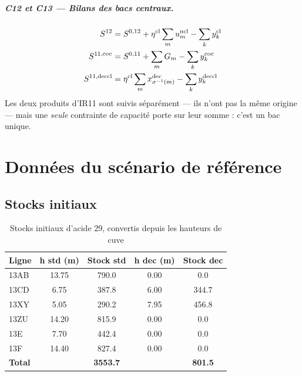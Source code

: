 \paragraph{C12 et C13 --- Bilans des bacs centraux.}
\begin{align}
S^{12} &= S^{0,12} + \eta^{\mathrm{cl}} \sum_{m} u^{\mathrm{ncl}}_m - \sum_{k} y^{\mathrm{cl}}_{k} \\
S^{11,\mathrm{coc}} &= S^{0,11} + \sum_{m} G_m - \sum_{k} y^{\mathrm{coc}}_{k} \\
S^{11,\mathrm{deccl}} &= \eta^{\mathrm{cl}} \sum_{m} x^{\mathrm{dec}}_{\sigma^{-1}(m)} - \sum_{k} y^{\mathrm{deccl}}_{k}
\end{align}
Les deux produits d'IR11 sont suivis séparément --- ils n'ont pas la même origine --- mais
une \emph{seule} contrainte de capacité porte sur leur somme : c'est un bac unique.

\chapter{Données du scénario de référence}
\label{ann:donnees}

\section{Stocks initiaux}

\begin{table}[H]
\centering
\caption{Stocks initiaux d'acide 29, convertis depuis les hauteurs de cuve}
\label{tab:stocks-29}
\begin{tabular}{@{}lS[table-format=2.2]S[table-format=4.1]S[table-format=1.2]S[table-format=3.1]@{}}
\toprule
\textbf{Ligne} & {\textbf{h std} (\si{\meter})} & {\textbf{Stock std}} & {\textbf{h dec} (\si{\meter})} & {\textbf{Stock dec}} \\
\midrule
13AB & 13.75 & 790.0 & 0.00 & 0.0 \\
13CD & 6.75 & 387.8 & 6.00 & 344.7 \\
13XY & 5.05 & 290.2 & 7.95 & 456.8 \\
13ZU & 14.20 & 815.9 & 0.00 & 0.0 \\
13E & 7.70 & 442.4 & 0.00 & 0.0 \\
13F & 14.40 & 827.4 & 0.00 & 0.0 \\
\midrule
\textbf{Total} & & \bfseries 3553.7 & & \bfseries 801.5 \\
\bottomrule
\end{tabular}
\end{table}

